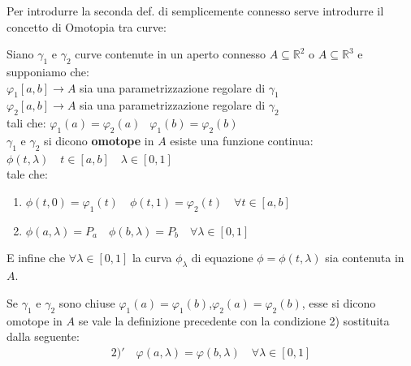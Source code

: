 \documentclass[a4paper, oneside]{article}
\newcommand{\tab}{\hspace*{2em}}
\begin{document}
Per introdurre la seconda def. di semplicemente connesso serve introdurre il concetto di Omotopia tra curve:
\begin{definition}
    Siano $\gamma_1$ e $\gamma_2$ curve contenute in un aperto connesso $A \subseteq \mathbb{R}^2$ o $A \subseteq \mathbb{R}^3$ e supponiamo che:\\
    $\varphi_1[a,b] \to A$ \tab sia una parametrizzazione regolare di $\gamma_1$\\
    $\varphi_2[a,b] \to A$ \tab sia una parametrizzazione regolare di $\gamma_2$\\
    tali che: \tab $\varphi_1(a) = \varphi_2(a) \ $  $ \ \varphi_1(b) = \varphi_2(b)$\\
    $\gamma_1$ e $\gamma_2$ si dicono \textbf{omotope} in $A$  esiste una funzione continua: $\phi(t, \lambda) \quad t \in [a,b] \quad \lambda \in [0,1]$\\
    tale che:
    \begin{enumerate}[1)]
        \item $\phi(t, 0) = \varphi_1(t) \quad \phi(t,1) = \varphi_2(t) \quad \forall t \in [a,b]$
        \item $\phi(a, \lambda) = P_a \quad \phi(b , \lambda) = P_b \quad \forall \lambda \in [0,1]$
    \end{enumerate}
    E infine che $\forall \lambda \in [0,1]$ la curva $\phi_\lambda$ di equazione $\phi = \phi(t,\lambda)$ sia contenuta in $A$.
    \begin{center}
    \end{center}
\end{definition}


\begin{proposition}
    Se $\gamma_1$ e $\gamma_2$ sono chiuse $\varphi_1(a) = \varphi_1(b)$,$\varphi_2(a) = \varphi_2(b)$, esse si dicono omotope in $A$ se vale la definizione precedente con la condizione 2) sostituita dalla seguente:
    \begin{gather*}
        2)' \quad \varphi(a,\lambda) = \varphi(b,\lambda) \quad \forall \lambda \in [0,1]
    \end{gather*}
\end{proposition}
\end{document}

